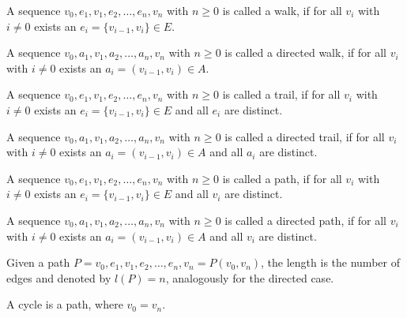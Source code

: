 \begin{definition}[Walk]
A sequence $v_0,e_1,v_1,e_2,\ldots ,e_n,v_n$ with $n \geq 0$ is called
a walk, if for all $v_i$ with $i \neq 0$ exists an $e_i = \{v_{i-1} , v_i \} \in E$.
\end{definition}

\begin{definition}
A sequence $v_0,a_1,v_1,a_2,\ldots ,a_n,v_n$ with $n \geq 0$ is called a directed walk, if for all $v_i$ with $i \neq 0$ exists an $a_i = (v_{i-1} , v_i ) \in A$.
\end{definition}

\begin{definition}[Trail]
A sequence $v_0,e_1,v_1,e_2,\dots ,e_n,v_n$ with $n \geq 0$ is called a trail, if for all $v_i$ with $i \neq 0$ exists an $e_i = \{v_{i-1}, v_i\} \in E$ and all $e_i$ are distinct.
\end{definition}

\begin{definition}
A sequence $v_0,a_1,v_1,a_2,\ldots ,a_n,v_n$ with $n \geq 0$ is called a directed trail, if for all $v_i$ with $i \neq 0$ exists an $a_i = (v_{i-1}, v_i) \in A$ and all $a_i$ are distinct.
\end{definition}

\begin{definition}[Path]
A sequence $v_0,e_1,v_1,e_2,\ldots , e_n,v_n$ with $n \geq 0$ is called a path, if for all $v_i$ with $i \neq 0$ exists an $e_i = \{v_{i-1} , v_i\} \in E$ and all $v_i$ are distinct.
\end{definition}

\begin{definition}
A sequence $v_0,a_1,v_1,a_2,\ldots ,a_n,v_n$ with $n \geq 0$ is called a directed path, if for all $v_i$ with $i \neq 0$ exists an $a_i = (v_{i-1}, v_i) \in A$ and all $v_i$ are distinct.
\end{definition}

\begin{definition}
Given a path $P = v_0,e_1,v_1,e_2,\ldots ,e_n,v_n = P(v_0,v_n)$, the length is the number of edges and denoted by $l(P) = n$, analogously for the directed case.
\end{definition}

\begin{definition}[Cycle]
A cycle is a path, where $v_0 = v_n$.
\end{definition}

